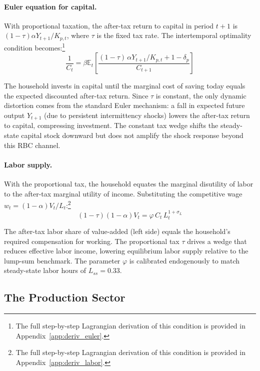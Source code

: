\documentclass[12pt, a4paper]{article}
\begin{document}
	\paragraph{Euler equation for capital.} With proportional taxation, the after-tax return to capital in period $t+1$ is $(1-\tau)\alpha Y_{t+1}/K_{p,t}$, where $\tau$ is the fixed tax rate. The intertemporal optimality condition becomes:\footnote{The full step-by-step Lagrangian derivation of this condition is provided in Appendix~\ref{app:deriv_euler}.}
	\begin{equation}
		\frac{1}{C_t} = \beta \mathbb{E}_t \left[ \frac{(1-\tau)\,\alpha Y_{t+1}/K_{p,t} + 1 - \delta_p}{C_{t+1}} \right]
		\label{eq:euler}
	\end{equation}
	
	The household invests in capital until the marginal cost of saving today equals the expected discounted after-tax return. Since $\tau$ is constant, the only dynamic distortion comes from the standard Euler mechanism: a fall in expected future output $Y_{t+1}$ (due to persistent intermittency shocks) lowers the after-tax return to capital, compressing investment. The constant tax wedge shifts the steady-state capital stock downward but does not amplify the shock response beyond this RBC channel.
	
	\paragraph{Labor supply.} With the proportional tax, the household equates the marginal disutility of labor to the after-tax marginal utility of income. Substituting the competitive wage $w_t = (1-\alpha)V_t/L_t$:\footnote{The full step-by-step Lagrangian derivation of this condition is provided in Appendix~\ref{app:deriv_labor}.}
	\begin{equation}
		(1-\tau)(1-\alpha) V_t = \varphi \, C_t \, L_t^{1+\sigma_L}
		\label{eq:labor_supply}
	\end{equation}
	
	The after-tax labor share of value-added (left side) equals the household's required compensation for working. The proportional tax $\tau$ drives a wedge that reduces effective labor income, lowering equilibrium labor supply relative to the lump-sum benchmark. The parameter $\varphi$ is calibrated endogenously to match steady-state labor hours of $L_{ss} = 0.33$.
	
	\subsection{The Production Sector}
	
\end{document}
